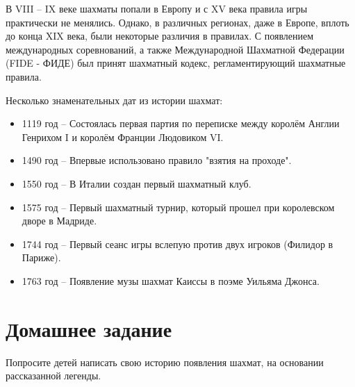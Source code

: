 В VIII -- IX веке шахматы попали в Европу и с XV века правила игры практически не менялись. Однако, в различных регионах, даже в Европе, вплоть до конца XIX века, были некоторые различия в правилах. С появлением международных соревнований, а также Международной Шахматной Федерации (FIDE - ФИДЕ) был принят шахматный кодекс, регламентирующий шахматные правила.

Несколько знаменательных дат из истории шахмат:
\begin{itemize}
\setlength\itemsep{-0.5em}
\item 1119 год -- Состоялась первая партия по переписке между королём Англии Генрихом I и королём Франции Людовиком VI. 
\item 1490 год -- Впервые использовано правило "взятия на проходе". 
\item 1550 год -- В Италии создан первый шахматный клуб. 
\item 1575 год -- Первый шахматный турнир, который прошел при королевском дворе в Мадриде. 
\item 1744 год -- Первый сеанс игры вслепую против двух игроков (Филидор в Париже).
\item 1763 год -- Появление музы шахмат Каиссы в поэме Уильяма Джонса.
\end{itemize}

\clearpage

\section{Домашнее задание}

Попросите детей написать свою историю появления шахмат, на основании рассказанной легенды.
